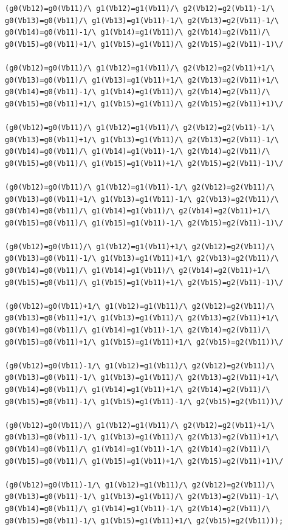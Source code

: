 \begin{lstlisting}[language=minizinc,numbers=none,caption={Encoding for 3Dblue piece1},label={lst:constraint}]
(g0(Vb12)=g0(Vb11)/\ g1(Vb12)=g1(Vb11)/\ g2(Vb12)=g2(Vb11)-1/\ g0(Vb13)=g0(Vb11)/\ g1(Vb13)=g1(Vb11)-1/\ g2(Vb13)=g2(Vb11)-1/\ g0(Vb14)=g0(Vb11)-1/\ g1(Vb14)=g1(Vb11)/\ g2(Vb14)=g2(Vb11)/\ g0(Vb15)=g0(Vb11)+1/\ g1(Vb15)=g1(Vb11)/\ g2(Vb15)=g2(Vb11)-1)\/ 

(g0(Vb12)=g0(Vb11)/\ g1(Vb12)=g1(Vb11)/\ g2(Vb12)=g2(Vb11)+1/\ g0(Vb13)=g0(Vb11)/\ g1(Vb13)=g1(Vb11)+1/\ g2(Vb13)=g2(Vb11)+1/\ g0(Vb14)=g0(Vb11)-1/\ g1(Vb14)=g1(Vb11)/\ g2(Vb14)=g2(Vb11)/\ g0(Vb15)=g0(Vb11)+1/\ g1(Vb15)=g1(Vb11)/\ g2(Vb15)=g2(Vb11)+1)\/ 

(g0(Vb12)=g0(Vb11)/\ g1(Vb12)=g1(Vb11)/\ g2(Vb12)=g2(Vb11)-1/\ g0(Vb13)=g0(Vb11)+1/\ g1(Vb13)=g1(Vb11)/\ g2(Vb13)=g2(Vb11)-1/\ g0(Vb14)=g0(Vb11)/\ g1(Vb14)=g1(Vb11)-1/\ g2(Vb14)=g2(Vb11)/\ g0(Vb15)=g0(Vb11)/\ g1(Vb15)=g1(Vb11)+1/\ g2(Vb15)=g2(Vb11)-1)\/ 

(g0(Vb12)=g0(Vb11)/\ g1(Vb12)=g1(Vb11)-1/\ g2(Vb12)=g2(Vb11)/\ g0(Vb13)=g0(Vb11)+1/\ g1(Vb13)=g1(Vb11)-1/\ g2(Vb13)=g2(Vb11)/\ g0(Vb14)=g0(Vb11)/\ g1(Vb14)=g1(Vb11)/\ g2(Vb14)=g2(Vb11)+1/\ g0(Vb15)=g0(Vb11)/\ g1(Vb15)=g1(Vb11)-1/\ g2(Vb15)=g2(Vb11)-1)\/ 

(g0(Vb12)=g0(Vb11)/\ g1(Vb12)=g1(Vb11)+1/\ g2(Vb12)=g2(Vb11)/\ g0(Vb13)=g0(Vb11)-1/\ g1(Vb13)=g1(Vb11)+1/\ g2(Vb13)=g2(Vb11)/\ g0(Vb14)=g0(Vb11)/\ g1(Vb14)=g1(Vb11)/\ g2(Vb14)=g2(Vb11)+1/\ g0(Vb15)=g0(Vb11)/\ g1(Vb15)=g1(Vb11)+1/\ g2(Vb15)=g2(Vb11)-1)\/ 

(g0(Vb12)=g0(Vb11)+1/\ g1(Vb12)=g1(Vb11)/\ g2(Vb12)=g2(Vb11)/\ g0(Vb13)=g0(Vb11)+1/\ g1(Vb13)=g1(Vb11)/\ g2(Vb13)=g2(Vb11)+1/\ g0(Vb14)=g0(Vb11)/\ g1(Vb14)=g1(Vb11)-1/\ g2(Vb14)=g2(Vb11)/\ g0(Vb15)=g0(Vb11)+1/\ g1(Vb15)=g1(Vb11)+1/\ g2(Vb15)=g2(Vb11))\/ 

(g0(Vb12)=g0(Vb11)-1/\ g1(Vb12)=g1(Vb11)/\ g2(Vb12)=g2(Vb11)/\ g0(Vb13)=g0(Vb11)-1/\ g1(Vb13)=g1(Vb11)/\ g2(Vb13)=g2(Vb11)+1/\ g0(Vb14)=g0(Vb11)/\ g1(Vb14)=g1(Vb11)+1/\ g2(Vb14)=g2(Vb11)/\ g0(Vb15)=g0(Vb11)-1/\ g1(Vb15)=g1(Vb11)-1/\ g2(Vb15)=g2(Vb11))\/ 

(g0(Vb12)=g0(Vb11)/\ g1(Vb12)=g1(Vb11)/\ g2(Vb12)=g2(Vb11)+1/\ g0(Vb13)=g0(Vb11)-1/\ g1(Vb13)=g1(Vb11)/\ g2(Vb13)=g2(Vb11)+1/\ g0(Vb14)=g0(Vb11)/\ g1(Vb14)=g1(Vb11)-1/\ g2(Vb14)=g2(Vb11)/\ g0(Vb15)=g0(Vb11)/\ g1(Vb15)=g1(Vb11)+1/\ g2(Vb15)=g2(Vb11)+1)\/ 

(g0(Vb12)=g0(Vb11)-1/\ g1(Vb12)=g1(Vb11)/\ g2(Vb12)=g2(Vb11)/\ g0(Vb13)=g0(Vb11)-1/\ g1(Vb13)=g1(Vb11)/\ g2(Vb13)=g2(Vb11)-1/\ g0(Vb14)=g0(Vb11)/\ g1(Vb14)=g1(Vb11)-1/\ g2(Vb14)=g2(Vb11)/\ g0(Vb15)=g0(Vb11)-1/\ g1(Vb15)=g1(Vb11)+1/\ g2(Vb15)=g2(Vb11)));
\end{lstlisting}
